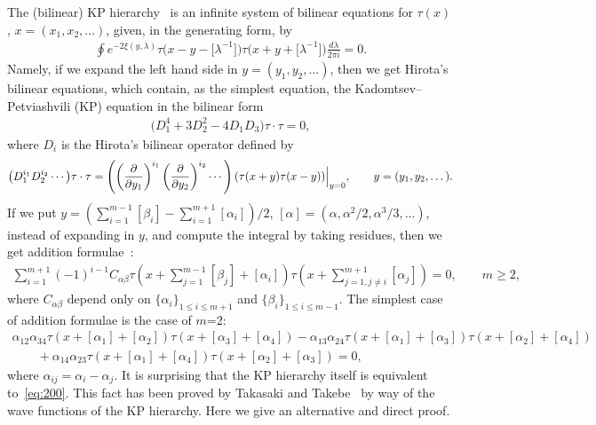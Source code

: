 \documentclass[pdftex]{sigma}
\begin{document}
The (bilinear) KP hierarchy~\cite{JM1} is an inf\/inite system of bilinear equations for $\tau(x)$,
$x=(x_1,x_2,\dots)$, given, in the generating form, by
\begin{gather*}
\oint e^{-2\xi(y,\lambda)}\tau\big(x-y-\big[\lambda^{-1}\big]\big)\tau\big(x+y+\big[\lambda^{-1}\big]\big)\frac{d\lambda}{2\pi i}=0.
\end{gather*}
Namely, if we expand the left hand side in $y=(y_1,y_2,\dots)$, then we get Hirota's bilinear equations,
which contain, as the simplest equation, the Kadomtsev--Petviashvili (KP) equation in the bilinear form
\begin{gather*}%
\big(D_1^4+3D_2^2-4D_1D_3\big)\tau\cdot\tau=0,
\end{gather*}
where $D_i$ is the Hirota's bilinear operator def\/ined by
\begin{gather*}%
\big(D_1^{i_1}D_2^{i_2}\cdots\big)\tau\cdot\tau=\left(\left(\frac{\partial}{\partial y_1}\right)^{i_1}
\left(\frac{\partial}{\partial y_2}\right)^{i_2}\cdots\right)(\tau(x+y)\tau(x-y))\Bigl|_{y=0},
\qquad
y=(y_1,y_2,\dots).
\end{gather*}
If we put $y=\left(\sum\limits_{i=1}^{m-1}[\beta_i]-\sum\limits_{i=1}^{m+1}[\alpha_i]\right)/2$, $[\alpha]=(\alpha,\alpha^2/2,\alpha^3/3,\dots)$, instead of expanding in $y$,
and compute the integral by taking residues, then we get
addition formulae~\cite{SS1}:
\begin{gather}
\sum_{i=1}^{m+1}(-1)^{i-1}C_{\alpha\beta}\tau
\left(x+\sum_{j=1}^{m-1}[\beta_j]+[\alpha_i]\right)\tau
\left(x+\sum_{j=1,j\neq i}^{m+1}[\alpha_j]\right)=0,
\qquad  m\ge2,
\label{eq:204}
\end{gather}
where $C_{\alpha\beta}$ depend only on $\{\alpha_i\}_{1\le i\le m+1}$ and $\{\beta_i\}_{1\le i\le m-1}$.
The simplest case of addition formulae is the case of $m$=2:
\begin{gather}
\alpha_{12}\alpha_{34}\tau(x+[\alpha_1]+[\alpha_2])\tau(x+[\alpha_3]+[\alpha_4])
-\alpha_{13}\alpha_{24}\tau(x+[\alpha_1]+[\alpha_3])\tau(x+[\alpha_2]+[\alpha_4])
\nonumber
\\
\qquad
{}+\alpha_{14}\alpha_{23}\tau(x+[\alpha_1]+[\alpha_4])\tau(x+[\alpha_2]+[\alpha_3])=0,
\label{eq:200}
\end{gather}
where $\alpha_{ij}=\alpha_i-\alpha_j$.
It is surprising that the KP hierarchy itself is equivalent to~\eqref{eq:200}.
This fact has been proved by Takasaki and Takebe~\cite{TT1} by way of the wave functions of the KP
hierarchy.
Here we give an alternative and direct proof.
\end{document}
